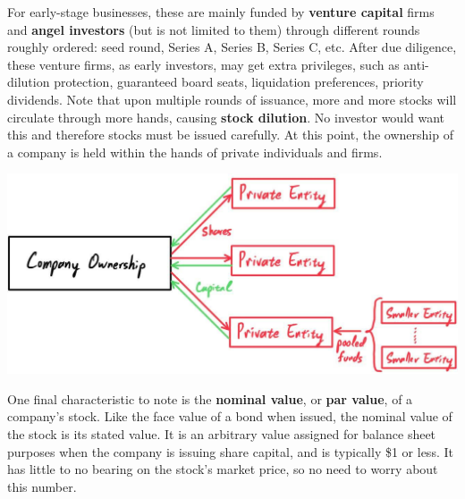 \documentclass{article}
\begin{document}
For early-stage businesses, these are mainly funded by \textbf{venture capital} firms and \textbf{angel investors} (but is not limited to them) through different rounds roughly ordered: seed round, Series A, Series B, Series C, etc. After due diligence, these venture firms, as early investors, may get extra privileges, such as anti-dilution protection, guaranteed board seats, liquidation preferences, priority dividends. Note that upon multiple rounds of issuance, more and more stocks will circulate through more hands, causing \textbf{stock dilution}. No investor would want this and therefore stocks must be issued carefully. At this point, the ownership of a company is held within the hands of private individuals and firms.
\begin{center}
    \includegraphics[scale=0.25]{img/company_in_private_hands.jpg}
\end{center}
One final characteristic to note is the \textbf{nominal value}, or \textbf{par value}, of a company's stock. Like the face value of a bond when issued, the nominal value of the stock is its stated value. It is an arbitrary value assigned for balance sheet purposes when the company is issuing share capital, and is typically \$1 or less. It has little to no bearing on the stock's market price, so no need to worry about this number.
\end{document}
